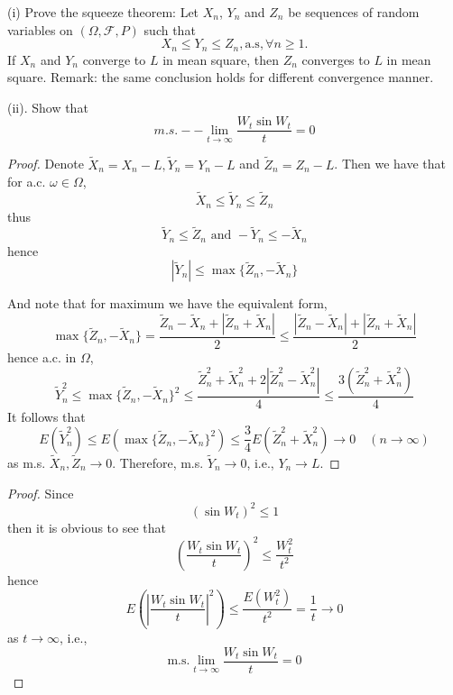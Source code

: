     \problem
    \begin{question}
        \noindent(i)  Prove the squeeze theorem:  Let $X_n$, $Y_n$ and $Z_n$ be sequences
        of random variables on $(\Omega,\mathcal F,P)$ such that
        \[X_n\leq Y_n\leq Z_n, \text{a.s},\forall n\geq 1.\]
        If $X_n$ and $Y_n$ converge to $L$ in mean square, then $Z_n$
        converges to $L$ in mean square.  Remark:  the same conclusion holds
        for different convergence manner.

        \noindent(ii).  Show that \[m.s.--\lim_{t\rightarrow \infty}\frac{W_t\sin W_t}{t}=0\]
    \end{question}
    \begin{subproblem}
        \item
        \begin{proof}
            Denote $\tilde X_n=X_n-L,\tilde Y_n=Y_n-L$
            and $\tilde Z_n=Z_n-L$. Then we have that for a.c.
            $\omega\in\Omega$,
            \[\tilde X_n\leq\tilde Y_n\leq\tilde Z_n\]
            thus
            \[\tilde Y_n\leq\tilde Z_n\text{ and }
            -\tilde Y_n\leq-\tilde X_n\]
            hence
            \[|\tilde Y_n|\leq\max\{\tilde Z_n,-\tilde X_n\}\]

            And note that for maximum we have the equivalent form,
            \[\max\{\tilde Z_n,-\tilde X_n\}
            =\frac{\tilde Z_n-\tilde X_n+|\tilde Z_n+\tilde X_n|}{2}
            \leq\frac{|\tilde Z_n-\tilde X_n|+|\tilde Z_n+\tilde X_n|}{2}\]
            hence a.c. in $\Omega$,
            \[\tilde Y^2_n\leq
            \max\{\tilde Z_n,-\tilde X_n\}^2
            \leq\frac{\tilde Z_n^2+\tilde X_n^2+2|\tilde Z_n^2-\tilde X_n^2|}{4}
            \leq\frac{3(\tilde Z_n^2+\tilde X_n^2)}{4}\]
            It follows that
            \[E(\tilde Y_n^2)
            \leq E(\max\{\tilde Z_n,-\tilde X_n\}^2)
            \leq\frac{3}{4}E(\tilde Z_n^2+\tilde X_n^2)
            \to 0\quad(n\to\infty)\]
            as m.s. $\tilde X_n,\tilde Z_n\to 0$. Therefore,
            m.s. $\tilde Y_n\to 0$, i.e., $Y_n\to L$.
        \end{proof}

        \item
        \begin{proof}
            Since
            \[(\sin W_t)^2\leq 1\]
            then it is obvious to see that
            \[\left(\frac{W_t\sin W_t}{t}\right)^2\leq\frac{W_t^2}{t^2}\]
            hence
            \[E\left(\left|\frac{W_t\sin W_t}{t}\right|^2\right)
            \leq\frac{E(W_t^2)}{t^2}=\frac{1}{t}\to 0\]
            as $t\to\infty$, i.e.,
            \[\text{m.s.}\lim_{t\to\infty}\frac{W_t\sin W_t}{t}=0\]
        \end{proof}
    \end{subproblem}